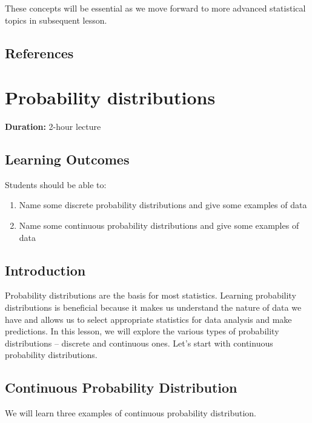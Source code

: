 \documentclass[
]{book}
\providecommand{\tightlist}{%
  \setlength{\itemsep}{0pt}\setlength{\parskip}{0pt}}
\begin{document}
These concepts will be essential as we move forward to more advanced statistical topics in subsequent lesson.

\section{References}\label{references-2}

\chapter{Probability distributions}\label{distributions}

\textbf{Duration:} 2-hour lecture

\section{Learning Outcomes}\label{learning-outcomes-3}

Students should be able to:

\begin{enumerate}
\def\labelenumi{\arabic{enumi}.}
\tightlist
\item
  Name some discrete probability distributions and give some examples of data
\item
  Name some continuous probability distributions and give some examples of data
\end{enumerate}

\section{Introduction}\label{introduction-3}

Probability distributions are the basis for most statistics. Learning probability distributions is beneficial because it makes us understand the nature of data we have and allows us to select appropriate statistics for data analysis and make predictions. In this lesson, we will explore the various types of probability distributions -- discrete and continuous ones. Let's start with continuous probability distributions.

\section{Continuous Probability Distribution}\label{continuous-probability-distribution}

We will learn three examples of continuous probability distribution.
\end{document}
